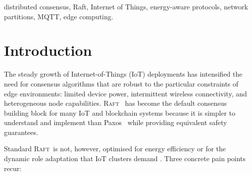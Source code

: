 \documentclass[conference]{IEEEtran}
\newcommand{\echoproto}{\textsc{Echo}\xspace}
\newcommand{\raftproto}{\textsc{Raft}\xspace}
\newcommand{\echodproto}{\textsc{echoD}\xspace}
\begin{document}
\begin{abstract}
\echoproto's tiered topology and provisional consensus but adds six
targeted optimizations--edge-side delta filtering, batched
event-driven consensus, coordinators-only adaptive liveness,
battery-ordered election timeouts, directed leader handoff, and
batched partition reconciliation--none of which weakens \raftproto's
safety argument. On a matched 5-coordinator, 10-leaf, 5-second workload,
\echodproto\ uses $4$--$6\times$ fewer messages than \raftproto\ and
\echoproto\ while keeping commit latency and cluster availability equal
or better. We implement all three protocols on a shared asyncio message
bus ($\approx$4~KLOC Python) and release a hardware-free MQTT system
that runs any of the three over real network transport, with a
Flask+Socket.IO dashboard. The codebase is open source.
\end{abstract}

\begin{IEEEkeywords}
distributed consensus, Raft, Internet of Things, energy-aware protocols,
network partitions, MQTT, edge computing.
\end{IEEEkeywords}

\section{Introduction}

The steady growth of Internet-of-Things (IoT) deployments has intensified
the need for consensus algorithms that are robust to the particular
constraints of edge environments: limited device power, intermittent
wireless connectivity, and heterogeneous node capabilities. \raftproto\
\cite{ongaro2014raft,ongaro2014dissertation} has become the default
consensus building block for many IoT and blockchain systems because it
is simpler to understand and implement than Paxos~\cite{lamport1998paxos}
while providing equivalent safety guarantees.

Standard \raftproto\ is not, however, optimised for energy efficiency or
for the dynamic role adaptation that IoT clusters demand
\cite{barros2023edraft,paris2015reducing,howard2021arc}. Three concrete
pain points recur:
\end{document}
